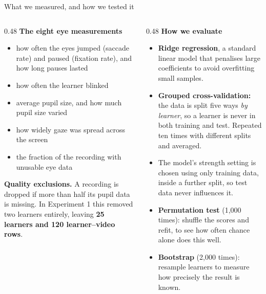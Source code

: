 \documentclass[aspectratio=169,10pt]{beamer}
\begin{document}
\begin{frame}{What we measured, and how we tested it}
  \begin{columns}[T]
    \begin{column}{0.48\textwidth}
      \textbf{The eight eye measurements}
      \begin{itemize}\small
        \item how often the eyes jumped (saccade rate) and paused
          (fixation rate), and how long pauses lasted
        \item how often the learner blinked
        \item average pupil size, and how much pupil size varied
        \item how widely gaze was spread across the screen
        \item the fraction of the recording with unusable eye data
      \end{itemize}

      \vspace{0.4em}
      \textbf{Quality exclusions.} A recording is dropped if more than half
      its pupil data is missing. In Experiment 1 this removed two learners
      entirely, leaving \textbf{25 learners and 120 learner--video rows}.
    \end{column}
    \begin{column}{0.48\textwidth}
      \textbf{How we evaluate}
      \begin{itemize}\small
        \item \textbf{Ridge regression}, a standard linear model that
          penalises large coefficients to avoid overfitting small samples.
        \item \textbf{Grouped cross-validation:} the data is split five ways
          \emph{by learner}, so a learner is never in both training and test.
          Repeated ten times with different splits and averaged.
        \item The model's strength setting is chosen using only training
          data, inside a further split, so test data never influences it.
        \item \textbf{Permutation test} (1{,}000 times): shuffle the scores
          and refit, to see how often chance alone does this well.
        \item \textbf{Bootstrap} (2{,}000 times): resample learners to measure
          how precisely the result is known.
      \end{itemize}
    \end{column}
  \end{columns}
\end{frame}
\end{document}
